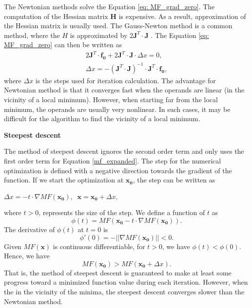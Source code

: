 The Newtonian methods solve the Equation \ref{eq: MF_grad_zero}. The computation of the Hessian matrix $\pmb{H}$ is expensive. As a result, approximation of the Hessian matrix is usually used. The Gauss-Newton method is a common method, where the $H$ is approximated by $2\pmb{J}^T \cdot \pmb{J}$ . The Equation \ref{eq: MF_grad_zero} can then be written as 
\begin{equation} \label{eq: gauss-newton}
\begin{align}
2 \pmb{J}^{T} \cdot \pmb{f_0} + 2\pmb{J}^T \cdot \pmb{J} \cdot \Delta x = 0 , \\
\Delta x = - (\pmb{J}^T \cdot \pmb{J} )^{-1} \cdot \pmb{J}^{T} \cdot \pmb{f_0},
\end{align}
\end{equation}
where $\Delta x$ is the steps used for iteration calculation. 
The advantage for Newtonian method is that it converges fast when the operands are linear (in the vicinity of a local minimum). However, when starting far from the local minimum, the operands are usually very nonlinear. In such cases, it may be difficult for the algorithm to find the vicinity of a local minimum. 
\newline

\textbf{Steepest descent}

The method of steepest descent  ignores the second order term and only uses the first order term for  Equation \ref{mf_expanded}. The step for the numerical optimization is defined with a negative direction towards the gradient of the function. If we start the optimization at $\pmb{x_0}$, the step can be written as
\medskip
\newline
\begin{center}
$
\Delta x = - t \cdot \nabla MF(\pmb{x_0}), \;\; \pmb{x} = \pmb{x_0} + \Delta x,
$
\end{center}
\medskip
where $t>0$, represents the size of the step. We define a function of $t$ as 
\begin{equation} \label{eq: function of t}
\phi(t) = MF(\pmb{x_0} - t \cdot \nabla MF(\pmb{x_0})).
\end{equation}The derivative of $\phi(t)$ at $t=0$ is
\begin{equation}\label{t=0}
\phi'(0) = - \vert\vert \nabla MF(\pmb{x_0}) \vert \vert < 0.
\end{equation}Given $MF(\pmb{x})$ is continuous differentiable, for $t>0$, we have $\phi(t) < \phi(0)$. Hence, we have
\begin{equation}
MF(\pmb{x_0}) > MF(\pmb{x_0} + \Delta x).
\end{equation}That is, the method of steepest descent is guaranteed to make at least some progress toward a minimized function value during each iteration. However, when the in the vicinity of the minima, the steepest descent converges slower than the Newtonian method.
\newline

